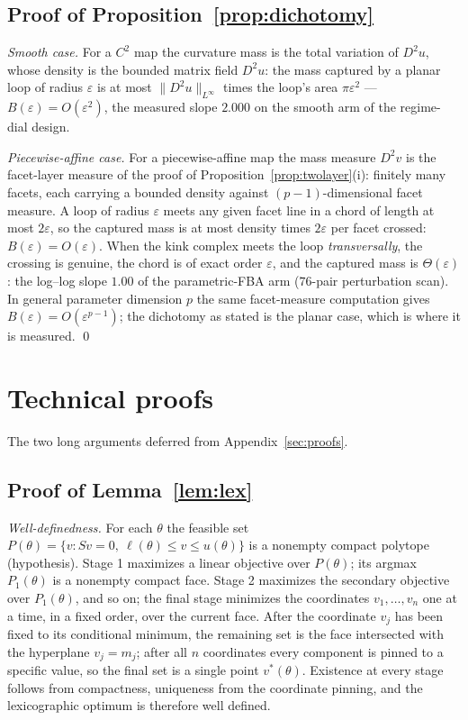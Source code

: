 \documentclass[11pt,a4paper]{article}
\theoremstyle{plain}
\theoremstyle{definition}
\theoremstyle{remark}
\begin{document}
\subsection{Proof of Proposition~\ref{prop:dichotomy}}

\emph{Smooth case.} For a $C^{2}$ map the curvature mass is the
total variation of $D^{2}u$, whose density is the bounded matrix
field $D^{2}u$: the mass captured by a planar loop of radius
$\varepsilon$ is at most $\|D^{2}u\|_{L^{\infty}}$ times the loop's
area $\pi\varepsilon^{2}$ --- $B(\varepsilon) = O(\varepsilon^{2})$,
the measured slope $2.000$ on the smooth arm of the regime-dial
design.

\emph{Piecewise-affine case.} For a piecewise-affine map the mass
measure $D^{2}v$ is the facet-layer measure of the proof of
Proposition~\ref{prop:twolayer}(i): finitely many facets, each
carrying a bounded density against $(p-1)$-dimensional facet
measure. A loop of radius $\varepsilon$ meets any given facet line
in a chord of length at most $2\varepsilon$, so the captured mass is
at most density times $2\varepsilon$ per facet crossed:
$B(\varepsilon) = O(\varepsilon)$. When the kink complex meets the
loop \emph{transversally}, the crossing is genuine, the chord is of
exact order $\varepsilon$, and the captured mass is
$\Theta(\varepsilon)$: the log--log slope $1.00$ of the
parametric-FBA arm ($76$-pair perturbation scan). In general
parameter dimension $p$ the same facet-measure computation gives
$B(\varepsilon) = O(\varepsilon^{p-1})$; the dichotomy as stated is
the planar case, which is where it is measured. \qed

\section{Technical proofs}\label{sec:techproofs}

The two long arguments deferred from Appendix~\ref{sec:proofs}.

\subsection{Proof of Lemma~\ref{lem:lex}}

\emph{Well-definedness.} For each $\theta$ the feasible set
$P(\theta) = \{v : Sv = 0,\ \ell(\theta) \le v \le u(\theta)\}$ is a
nonempty compact polytope (hypothesis). Stage 1 maximizes a linear
objective over $P(\theta)$; its argmax $P_1(\theta)$ is a nonempty
compact face. Stage 2 maximizes the secondary objective over
$P_1(\theta)$, and so on; the final stage minimizes the coordinates
$v_1, \dots, v_n$ one at a time, in a fixed order, over the current
face. After the coordinate $v_j$ has been fixed to its conditional
minimum, the remaining set is the face intersected with the
hyperplane $v_j = m_j$; after all $n$ coordinates every component is
pinned to a specific value, so the final set is a single point
$v^{*}(\theta)$. Existence at every stage follows from compactness,
uniqueness from the coordinate pinning, and the lexicographic
optimum is therefore well defined.
\end{document}
